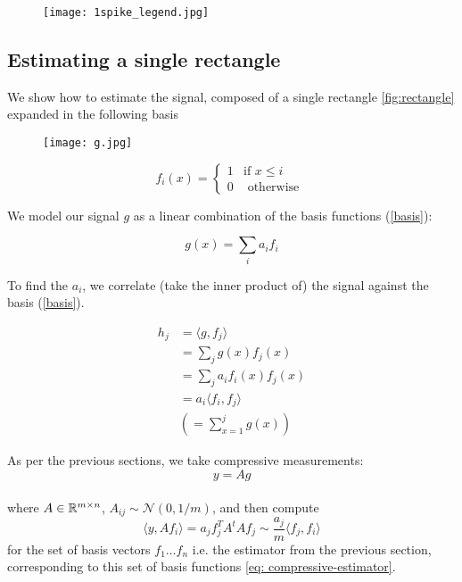 \begin{figure}[h]
\centering
\texttt{[image: 1spike\_legend.jpg]}
\caption{}
\label{fig:new_basis_25}
\end{figure}

\subsection{Estimating a single rectangle}

We show how to estimate the signal, composed of a single rectangle \eqref{fig:rectangle} expanded in the following basis

\begin{figure}[h]
\centering
\texttt{[image: g.jpg]}
\caption{}
\label{fig:rectangle}
\end{figure}

\begin{equation}
f_i\left(x\right) =
\begin{cases}
1 & \text{if } x \leq i \\
0 & \text{ otherwise } 
\end{cases}
\label{basis}
\end{equation}

We model our signal \(g\) as a linear combination of the basis functions (\ref{basis}):

\begin{equation}
g\left(x\right) = \sum_i a_i f_i 
\label{basis-expansion}
\end{equation}

To find the \(a_i\), we correlate (take the inner product of) the signal against the basis (\ref{basis}).

\begin{definition}
\begin{align}
h_j &= \langle g, f_j \rangle \\
&= \sum_j g\left(x\right) f_j\left(x\right) \\
&= \sum_j a_i f_i\left(x\right) f_j\left(x\right) \\
&= a_i \langle f_i, f_j\rangle \\
&\left(= \sum_{x=1}^j g\left(x\right)\right)
\end{align}
\end{definition}

As per the previous sections, we take compressive measurements:
\begin{equation}
y = Ag
\end{equation}
\\
where \(A \in {\mathbb{R}}^{m \times n} \), \(A_{ij} \sim \mathcal{N}\left(0,1/m\right)\), and then compute 
\begin{equation}
\langle y, Af_i\rangle = a_j  f_j^TA^tAf_j \sim \frac{a_j}{m} \langle f_j, f_i \rangle
\end{equation}
for the set of basis vectors \(f_1 \ldots f_n\) i.e. the estimator from the previous section, corresponding to this set of basis functions \eqref{eq: compressive-estimator}. 

